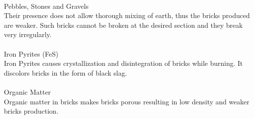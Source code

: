 \vspace{0.1cm}\\
Pebbles, Stones and Gravels\\
Their presence does not allow thorough mixing of earth, thus the bricks produced are weaker. Such bricks cannot be broken at the desired section and they break very irregularly.\\
\vspace{0.1cm}\\
Iron Pyrites (FeS)\\
Iron Pyrites causes crystallization and disintegration of bricks while burning. It discolors bricks in the form of black slag.\\
\vspace{0.1cm}\\
Organic Matter\\
Organic matter in bricks makes bricks porous resulting in low density and weaker bricks production.\\